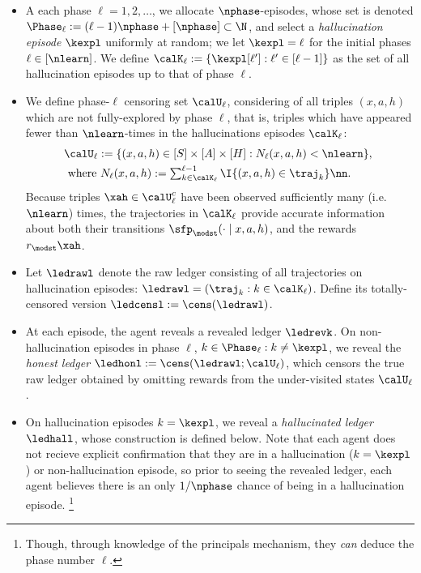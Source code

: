 \begin{itemize}
\item A  each phase $\ell = 1,2,\dots$, we allocate $\nphase$-episodes, whose set is denoted  $\Phase_{\ell} :=  (\ell - 1) \nphase  + [\nphase] \subset \N$, and select a \emph{hallucination episode} $\kexpl$ uniformly at random;  we let $\kexpl = \ell$ for the initial phases $\ell \in [\nlearn]$. We define $\calK_{\ell} := \{\kexpl[\ell']: \ell' \in [\ell-1]\}$ as the set of all hallucination episodes up to that of phase $\ell$.
\item We define phase-$\ell$ censoring set $\calU_{\ell}$, considering of all triples $(x,a,h)$ which {are not fully-explored} by phase $\ell$, that is, triples which have appeared fewer than $\nlearn$-times in the hallucinations episodes $\calK_{\ell}$:
\begin{align}
&\calU_{\ell} := \{(x,a,h) \in [S] \times [A] \times [H] : N_{\ell}(x,a,h) < \nlearn\}, ~ \label{eq:calU_def}\\
&\text{ where } N_{\ell}(x,a,h) := \textstyle\sum_{k \in \calK_{\ell}}^{\ell-1} \I\{(x,a,h) \in \traj_{k}\} \nn.
\end{align}
Because triples $\xah \in \calU_{\ell}^c$ have been observed sufficiently many (i.e. $\nlearn$) times, the trajectories in $\calK_{\ell}$ provide accurate information about both their transitions $\sfp_{\modst}(\cdot \mid x,a,h)$, and the rewards $r_{\modst}\xah$.
\item Let $\ledrawl$ denote the raw ledger consisting of all trajectories on hallucination episodes: $\ledrawl = (\traj_{k} : k \in \calK_{\ell})$. Define its totally-censored version $\ledcensl := \cens(\ledrawl)$.
\item At each episode, the agent reveals a revealed ledger $\ledrevk$. On non-hallucination episodes in phase $\ell$, $k \in \Phase_{\ell} : k \ne \kexpl$, we reveal the \emph{honest ledger}  $\ledhonl := \cens(\ledrawl ; \calU_{\ell})$, which censors the true raw ledger obtained by omitting rewards from the under-visited states $\calU_{\ell}$.
\item On hallucination episodes $k = \kexpl$, we reveal a \emph{hallucinated ledger}  $\ledhall$, whose construction is defined below.   Note that each agent does not recieve explicit confirmation that they are in a hallucination ($k = \kexpl$) or non-hallucination episode, so prior to seeing the revealed ledger, each agent believes there is an only $1/\nphase$ chance of being in a hallucination episode.  \footnote{Though, through knowledge of the principals mechanism, they \emph{can} deduce the phase number $\ell$.}

\end{itemize}
